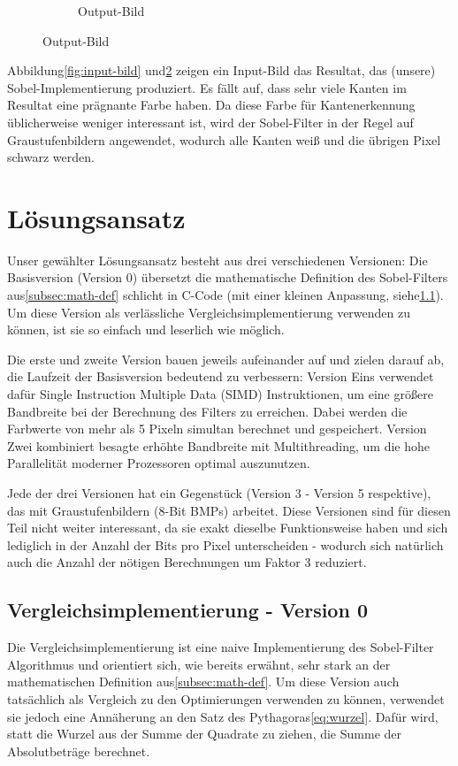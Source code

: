 \documentclass[course=erap]{aspdoc}
\begin{document}
\begin{figure}[H]
\begin{subfigure}{.5\columnwidth}
        \caption{Output-Bild}
        \label{fig:output-bild}
    \end{subfigure}
\end{figure}

Abbildung\ref{fig:input-bild} und\ref{fig:output-bild} zeigen ein Input-Bild das Resultat, das (unsere) Sobel-Implementierung produziert.
Es fällt auf, dass sehr viele Kanten im Resultat eine prägnante Farbe haben.
Da diese Farbe für Kantenerkennung üblicherweise weniger interessant ist, wird der Sobel-Filter in der Regel auf Graustufenbildern angewendet, wodurch alle Kanten weiß und die übrigen Pixel schwarz werden.

\section{Lösungsansatz}\label{sec:losungsansatz}
Unser gewählter Lösungsansatz besteht aus drei verschiedenen Versionen:
Die Basisversion (Version 0) übersetzt die mathematische Definition des Sobel-Filters aus\ref{subsec:math-def} schlicht in C-Code (mit einer kleinen Anpassung, siehe\ref{subsec:vergleichsimplementierung}).
Um diese Version als verlässliche Vergleichsimplementierung verwenden zu können, ist sie so einfach und leserlich wie möglich.

Die erste und zweite Version bauen jeweils aufeinander auf und zielen darauf ab, die Laufzeit der Basisversion bedeutend zu verbessern:
Version Eins verwendet dafür Single Instruction Multiple Data (SIMD) Instruktionen, um eine größere Bandbreite bei der Berechnung des Filters zu erreichen.
Dabei werden die Farbwerte von mehr als 5 Pixeln simultan berechnet und gespeichert.
Version Zwei kombiniert besagte erhöhte Bandbreite mit Multithreading, um die hohe Parallelität moderner Prozessoren optimal auszunutzen.

Jede der drei Versionen hat ein Gegenstück (Version 3 - Version 5 respektive), das mit Graustufenbildern (8-Bit BMPs) arbeitet.
Diese Versionen sind für diesen Teil nicht weiter interessant, da sie exakt dieselbe Funktionsweise haben und sich lediglich in der Anzahl der Bits pro Pixel unterscheiden - wodurch sich natürlich auch die Anzahl der nötigen Berechnungen um Faktor 3 reduziert.

\subsection{Vergleichsimplementierung - Version 0}
\label{subsec:vergleichsimplementierung}
Die Vergleichsimplementierung ist eine naive Implementierung des Sobel-Filter Algorithmus und orientiert sich, wie bereits erwähnt, sehr stark an der mathematischen Definition aus\ref{subsec:math-def}.
Um diese Version auch tatsächlich als Vergleich zu den Optimierungen verwenden zu können, verwendet sie jedoch eine Annäherung an den Satz des Pythagoras\ref{eq:wurzel}.
Dafür wird, statt die Wurzel aus der Summe der Quadrate zu ziehen, die Summe der Absolutbeträge berechnet.
\end{document}
